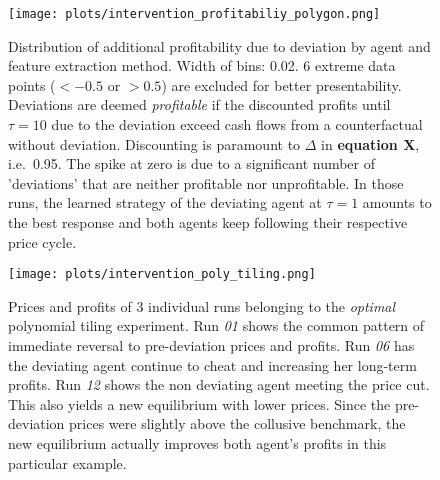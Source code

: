 \begin{figure}
	\texttt{[image: plots/intervention\_profitabiliy\_polygon.png]}
	\caption{Distribution of additional profitability due to deviation by agent and feature extraction method. Width of bins: 0.02. 6 extreme data points ($<-0.5$ or $>0.5$) are excluded for better presentability. Deviations are deemed \emph{profitable} if the discounted profits until $\tau = 10$ due to the deviation exceed cash flows from a counterfactual without deviation. Discounting is paramount to $\Delta$ in \textbf{equation X}, i.e.\ 0.95. The spike at zero is due to a significant number of 'deviations' that are neither profitable nor unprofitable. In those runs, the learned strategy of the deviating agent at $\tau = 1$ amounts to the best response and both agents keep following their respective price cycle.}
	\label{intervention_profitability_polygon}
\end{figure}


\begin{figure}
	\texttt{[image: plots/intervention\_poly\_tiling.png]}
	\caption{Prices and profits of 3 individual runs belonging to the \emph{optimal } polynomial tiling experiment. Run \emph{01} shows the common pattern of immediate reversal to pre-deviation prices and profits. Run \emph{06} has the deviating agent continue to cheat and increasing her long-term profits. Run \emph{12} shows the non deviating agent meeting the price cut. This also yields a new equilibrium with lower prices. Since the pre-deviation prices were slightly above the collusive benchmark, the new equilibrium actually improves both agent's profits in this particular example.}
	\label{intervention_poly_tiling}
\end{figure}